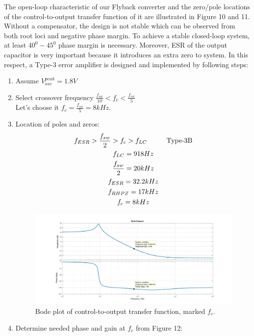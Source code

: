 \documentclass{article}
\newcommand\tab[1][1cm]{\hspace*{#1}}
\begin{document}
The open-loop characteristic of our Flyback converter and the zero/pole locations of the control-to-output transfer function of it are illustrated in Figure 10 and 11. Without a compensator, the design is not stable which can be observed from both root loci and negative phase margin. To achieve a stable closed-loop system, at least $40^0-45^0$ phase margin is necessary. Moreover, ESR of the output capacitor is very important because it introduces an extra zero to system.
In this respect, a Type-3 error amplifier is designed and implemented by following steps: 

\begin{enumerate}
    \item Assume $V_{osc}^{peak}=1.8V$\\
    \item Select crossover frequency $\frac{f_{sw}}{10}<f_c<\frac{f_{sw}}{5}$\\
    Let's choose it $f_c=\frac{f_{sw}}{5}=8kHz.$\\
    \item Location of poles and zeros:
    \begin{gather*}
        f_{ESR}>\frac{f_{sw}}{2}>f_c>f_{LC} \tab \text{Type-3B}\\
        f_{LC}=918Hz\\
        \frac{f_{sw}}{2}=20kHz\\
        f_{ESR}=32.2kHz\\
        f_{RHPZ}=17kHz\\
        f_c=8kHz\\
    \end{gather*}
 \begin{figure}[H]
    \centering
    \includegraphics[scale=0.2]{phase and gain at crossover frequency of open loop system.jpg}
    \caption{Bode plot of control-to-output transfer function, marked $f_c$.}
    \label{fig:my_label}
\end{figure}
\item Determine needed phase and gain at $f_c$ from Figure 12:

\end{enumerate}
\end{document}
